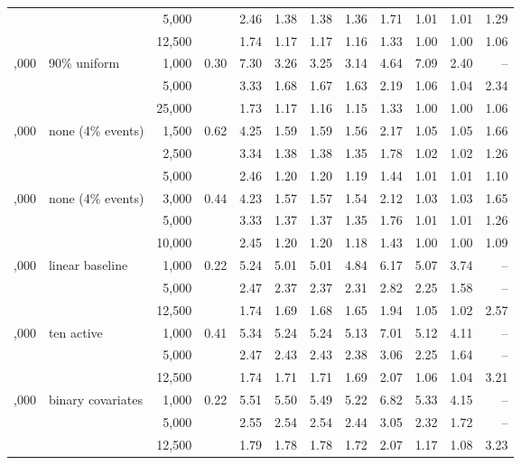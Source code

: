 \begin{tabular}{rlrrrrrrrrrr}
 &  & 5,000 &  & 2.46 & 1.38 & 1.38 & 1.36 & 1.71 & 1.01 & 1.01 & 1.29\\
 &  & 12,500 &  & 1.74 & 1.17 & 1.17 & 1.16 & 1.33 & 1.00 & 1.00 & 1.06\\
\addlinespace
50,000 & 90\% uniform & 1,000 & 0.30 & 7.30 & 3.26 & 3.25 & 3.14 & 4.64 & 7.09 & 2.40 & --\\
 &  & 5,000 &  & 3.33 & 1.68 & 1.67 & 1.63 & 2.19 & 1.06 & 1.04 & 2.34\\
 &  & 25,000 &  & 1.73 & 1.17 & 1.16 & 1.15 & 1.33 & 1.00 & 1.00 & 1.06\\
\addlinespace
25,000 & none (4\% events) & 1,500 & 0.62 & 4.25 & 1.59 & 1.59 & 1.56 & 2.17 & 1.05 & 1.05 & 1.66\\
 &  & 2,500 &  & 3.34 & 1.38 & 1.38 & 1.35 & 1.78 & 1.02 & 1.02 & 1.26\\
 &  & 5,000 &  & 2.46 & 1.20 & 1.20 & 1.19 & 1.44 & 1.01 & 1.01 & 1.10\\
\addlinespace
50,000 & none (4\% events) & 3,000 & 0.44 & 4.23 & 1.57 & 1.57 & 1.54 & 2.12 & 1.03 & 1.03 & 1.65\\
 &  & 5,000 &  & 3.33 & 1.37 & 1.37 & 1.35 & 1.76 & 1.01 & 1.01 & 1.26\\
 &  & 10,000 &  & 2.45 & 1.20 & 1.20 & 1.18 & 1.43 & 1.00 & 1.00 & 1.09\\
\addlinespace
25,000 & linear baseline & 1,000 & 0.22 & 5.24 & 5.01 & 5.01 & 4.84 & 6.17 & 5.07 & 3.74 & --\\
 &  & 5,000 &  & 2.47 & 2.37 & 2.37 & 2.31 & 2.82 & 2.25 & 1.58 & --\\
 &  & 12,500 &  & 1.74 & 1.69 & 1.68 & 1.65 & 1.94 & 1.05 & 1.02 & 2.57\\
\addlinespace
25,000 & ten active & 1,000 & 0.41 & 5.34 & 5.24 & 5.24 & 5.13 & 7.01 & 5.12 & 4.11 & --\\
 &  & 5,000 &  & 2.47 & 2.43 & 2.43 & 2.38 & 3.06 & 2.25 & 1.64 & --\\
 &  & 12,500 &  & 1.74 & 1.71 & 1.71 & 1.69 & 2.07 & 1.06 & 1.04 & 3.21\\
\addlinespace
25,000 & binary covariates & 1,000 & 0.22 & 5.51 & 5.50 & 5.49 & 5.22 & 6.82 & 5.33 & 4.15 & --\\
 &  & 5,000 &  & 2.55 & 2.54 & 2.54 & 2.44 & 3.05 & 2.32 & 1.72 & --\\
 &  & 12,500 &  & 1.79 & 1.78 & 1.78 & 1.72 & 2.07 & 1.17 & 1.08 & 3.23\\
\bottomrule
\end{tabular}
